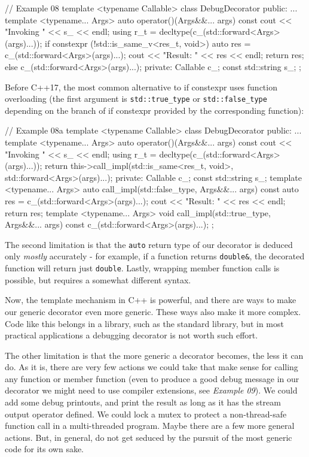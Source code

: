 \begin{code}
// Example 08
template <typename Callable> class DebugDecorator {
  public:
  ...
  template <typename... Args>
  auto operator()(Args&&... args) const {
    cout << "Invoking " << s_ << endl;
    using r_t = decltype(c_(std::forward<Args>(args)...));
    if constexpr (!std::is_same_v<res_t, void>) {
      auto res = c_(std::forward<Args>(args)...);
      cout << "Result: " << res << endl;
      return res;
    } else {
      c_(std::forward<Args>(args)...);
    }
  }
    private:
    Callable c_;
    const std::string s_;
};
\end{code}

Before C++17, the most common alternative to if constexpr uses function overloading (the first argument is \texttt{std::true\_type} or \texttt{std::false\_type} depending on the branch of if constexpr provided by the corresponding function):

\begin{code}
// Example 08a
template <typename Callable> class DebugDecorator {
  public:
  ...
  template <typename... Args>
  auto operator()(Args&&... args) const {
    cout << "Invoking " << s_ << endl;
    using r_t = decltype(c_(std::forward<Args>(args)...));
    return this->call_impl(std::is_same<res_t, void>{},
                           std::forward<Args>(args)...);
    }
    private:
    Callable c_;
    const std::string s_;
    template <typename... Args>
    auto call_impl(std::false_type, Args&&... args) const {
      auto res = c_(std::forward<Args>(args)...);
      cout << "Result: " << res << endl;
      return res;
    }
    template <typename... Args>
    void call_impl(std::true_type, Args&&... args) const {
      c_(std::forward<Args>(args)...);
  }
};
\end{code}

The second limitation is that the \texttt{auto} return type of our decorator is deduced only \emph{mostly} accurately - for example, if a function returns \texttt{double\&}, the decorated function will return just \texttt{double}. Lastly, wrapping member function calls is possible, but requires a somewhat different syntax.

Now, the template mechanism in C++ is powerful, and there are ways to make our generic decorator even more generic. These ways also make it more complex. Code like this belongs in a library, such as the standard library, but in most practical applications a debugging decorator is not worth such effort.

The other limitation is that the more generic a decorator becomes, the less it can do. As it is, there are very few actions we could take that make sense for calling any function or member function (even to produce a good debug message in our decorator we might need to use compiler extensions, see \emph{Example 09}). We could add some debug printouts, and print the result as long as it has the stream output operator defined. We could lock a mutex to protect a non-thread-safe function call in a multi-threaded program. Maybe there are a few more general actions. But, in general, do not get seduced by the pursuit of the most generic code for its own sake.

